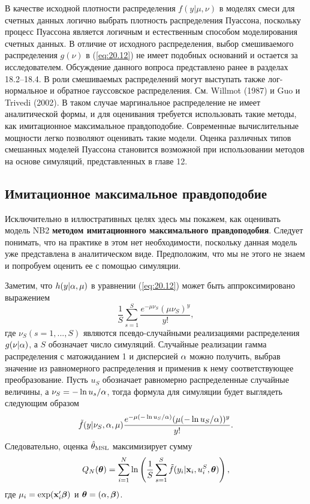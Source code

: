 В качестве исходной плотности распределения $f(y|\mu, \nu)$ в моделях смеси для счетных данных логично выбрать плотность распределения Пуассона, поскольку процесс Пуассона является логичным и естественным способом моделирования счетных данных. В отличие от исходного распределения, выбор смешиваемого распределения $g(\nu)$ в (\ref{eq:20.12}) не имеет подобных оснований и остается за исследователем. Обсуждение данного вопроса представлено ранее в разделах 18.2--18.4. В роли смешиваемых распределений могут выступать также лог-нормальное и обратное гауссовское распределения. См. Willmot (1987) и Guo и Trivedi (2002). В таком случае маргинальное распределение не имеет аналитической формы, и для оценивания требуется использовать такие методы, как имитационное максимальное правдоподобие. Современные вычислительные мощности легко позволяют оценивать такие модели. Оценка различных типов смешанных моделей Пуассона становится возможной при использовании методов на основе симуляций, представленных в главе 12.


\subsection{Имитационное максимальное правдоподобие}\label{sec:20.4.2}

\noindent
Исключительно в иллюстративных целях здесь мы покажем, как оценивать модель NB2 \textbf{методом имитационного максимального правдоподобия}. Следует понимать, что на практике в этом нет необходимости, поскольку данная модель уже представлена в аналитическом виде. Предположим, что мы не этого не знаем и попробуем оценить ее с помощью симуляции.

Заметим, что $h(y|\alpha, \mu)$ в уравнении (\ref{eq:20.12}) может быть аппроксимировано выражением
    $$\frac{1}{S}\sum^{S}_{s = 1} \frac{e^{-\mu\nu_S}(\mu\nu_S)^y}{y!},$$
где $\nu_S(s = 1, ..., S)$ являются псевдо-случайными реализациями распределения $g(\nu|\alpha)$, а $S$ обозначает число симуляций. Случайные реализации гамма распределения с матожиданием 1 и дисперсией $\alpha$ можно получить, выбрав значение из равномерного распределения и применив к нему соответствующее преобразование. Пусть $u_S$ обозначает равномерно распределенные случайные величины, а $\nu_S = -\ln u_s/\alpha$, тогда формула для симуляции будет выглядеть следующим образом
    $$\tilde{f}(y|\nu_S, \alpha, \mu)\frac{e^{-\mu(-\ln u_S / \alpha)}(\mu(-\ln u_S/\alpha))^y}{y!}.$$
Следовательно, оценка $\hat{\theta}_{\mathrm{MSL}}$ максимизирует сумму
    \begin{align}\label{eq:20.14}
    Q_N(\bm{\theta}) = \sum^{N}_{i = 1}\ln \left( \frac{1}{S}\sum^{S}_{s = 1}\tilde{f}(y_i|\mathbf{x}_i, u^S_i, \bm{\theta})\right),
    \end{align}
где $\mu_i = \exp(\mathbf{x}_i'\bm{\beta})$ и $\bm{\theta} = (\alpha, \bm{\beta})$.

